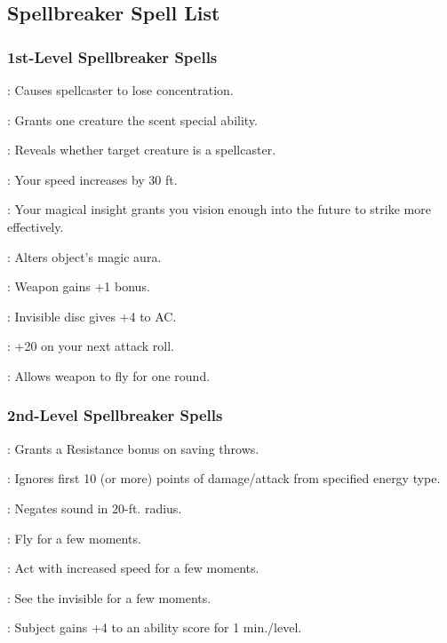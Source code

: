 \subsection{Spellbreaker Spell List}
\subsubsection{1st-Level Spellbreaker Spells}
\begin{list}{}{\leftmargin=1em}
  \item {}: Causes spellcaster to lose concentration.
  \item {}: Grants one creature the scent special ability.
  \item {}: Reveals whether target creature is a spellcaster.
  \item {}: Your speed increases by 30 ft.
  \item {}: Your magical insight grants you vision enough into the future to strike more effectively.
  \item {}: Alters object's magic aura.
  \item {}: Weapon gains +1 bonus.
  \item {}: Invisible disc gives +4 to AC.
  \item {}: +20 on your next attack roll.
  \item {}: Allows weapon to fly for one round.
\end{list}
\subsubsection{2nd-Level Spellbreaker Spells}
\begin{list}{}{\leftmargin=1em}
  \item {} : Grants a Resistance bonus on saving throws.
  \item {}: Ignores first 10 (or more) points of damage/attack from specified energy type.
  \item {}: Negates sound in 20-ft. radius.
  \item {}: Fly for a few moments.
  \item {}: Act with increased speed for a few moments.
  \item {}: See the invisible for a few moments.
  \item {}: Subject gains +4 to an ability score for 1 min./level.
\end{list}
